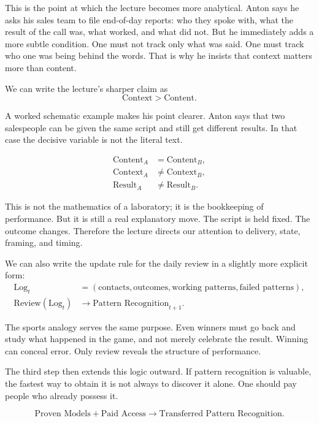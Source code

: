 This is the point at which the lecture becomes more analytical. Anton says he asks his sales team to file end-of-day reports: who they spoke with, what the result of the call was, what worked, and what did not. But he immediately adds a more subtle condition. One must not track only what was said. One must track who one was being behind the words. That is why he insists that context matters more than content.

We can write the lecture's sharper claim as
\begin{equation}
\text{Context} > \text{Content}.
\end{equation}

A worked schematic example makes his point clearer. Anton says that two salespeople can be given the same script and still get different results. In that case the decisive variable is not the literal text.

\begin{align}
\text{Content}_A &= \text{Content}_B,\\
\text{Context}_A &\neq \text{Context}_B,\\
\text{Result}_A &\neq \text{Result}_B.
\end{align}

This is not the mathematics of a laboratory; it is the bookkeeping of performance. But it is still a real explanatory move. The script is held fixed. The outcome changes. Therefore the lecture directs our attention to delivery, state, framing, and timing.

We can also write the update rule for the daily review in a slightly more explicit form:
\begin{align}
\text{Log}_t &= (\text{contacts},\text{outcomes},\text{working patterns},\text{failed patterns}),\\
\text{Review}(\text{Log}_t) &\to \text{Pattern Recognition}_{t+1}.
\end{align}

The sports analogy serves the same purpose. Even winners must go back and study what happened in the game, and not merely celebrate the result. Winning can conceal error. Only review reveals the structure of performance.

The third step then extends this logic outward. If pattern recognition is valuable, the fastest way to obtain it is not always to discover it alone. One should pay people who already possess it.

\begin{equation}
\text{Proven Models} + \text{Paid Access} \to \text{Transferred Pattern Recognition}.
\end{equation}

